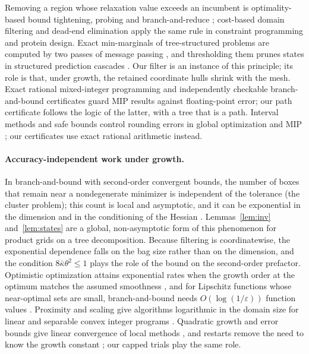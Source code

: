 Removing a region whose relaxation value exceeds an incumbent is
optimality-based bound tightening, probing and branch-and-reduce
\cite{RyooSahinidis1996,BelottiEtAl2009,GleixnerEtAl2017,PuranikSahinidis2017};
cost-based domain filtering \cite{FocacciLodiMilano1999} and dead-end
elimination \cite{DesmetEtAl1992,GainzaRobertsDonald2012} apply the same rule
in constraint programming and protein design. Exact min-marginals of
tree-structured problems are computed by two passes of message passing
\cite{Dawid1992,AjiMcEliece2000,WainwrightJaakkolaWillsky2005,KohliTorr2006},
and thresholding them prunes states in structured prediction cascades
\cite{WeissTaskar2010}. Our filter is an instance of this principle; its role
is that, under growth, the retained coordinate hulls shrink with the mesh.
Exact rational mixed-integer programming \cite{CookKochSteffyWolter2013} and
independently checkable branch-and-bound certificates
\cite{CheungGleixnerSteffy2017} guard MIP results against floating-point
error; our path certificate follows the logic of the latter, with a tree that
is a path. Interval methods and safe bounds control rounding errors in
global optimization and MIP \cite{Hansen1980,HansenWalster2004,
NeumaierShcherbina2004}; our certificates use exact rational arithmetic
instead.

\paragraph{Accuracy-independent work under growth.}
In branch-and-bound with second-order convergent bounds, the number of boxes
that remain near a nondegenerate minimizer is independent of the tolerance
(the cluster problem); this count is local and asymptotic, and it can be
exponential in the dimension and in the conditioning of the Hessian
\cite{DuKearfott1994,Neumaier2004,WechsungSchaberBarton2014,KannanBarton2017}.
Lemmas~\ref{lem:inv} and~\ref{lem:states} are a global, non-asymptotic form of
this phenomenon for product grids on a tree decomposition. Because filtering
is coordinatewise, the exponential dependence falls on the bag size rather
than on the dimension, and the condition $8\bar\kappa\theta^2\le1$ plays the
role of the bound on the second-order prefactor. Optimistic optimization
attains exponential rates when the growth order at the optimum matches the
assumed smoothness \cite{Munos2011}, and for Lipschitz functions whose
near-optimal sets are small, branch-and-bound needs $O(\log(1/\varepsilon))$
function values \cite{Perevozchikov1990}. Proximity and scaling give
algorithms logarithmic in the domain size for linear and separable convex
integer programs \cite{CookGerardsSchrijverTardos1986,HochbaumShanthikumar1990,
GranotSkorinKapov1990,HunkenschroderEtAl2026,EisenbrandEtAl2025}. Quadratic
growth and error bounds give linear convergence of local methods
\cite{LuoTseng1993,KarimiNutiniSchmidt2016,DrusvyatskiyLewis2018,
NecoaraNesterovGlineur2019}, and restarts remove the need to know the growth
constant \cite{RouletDAspremont2020}; our capped trials play the same role.

